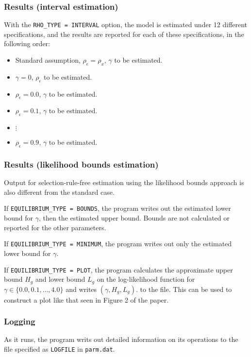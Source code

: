 \documentclass{article}
\begin{document}
\subsubsection{Results (interval estimation)}

With the {\tt RHO\_{}TYPE = INTERVAL} option, the model is estimated under 
12 different specifications, and the results are reported for each of these 
specifications, in the following order:
\begin{itemize}
	\item Standard assumption, $\rho_{\epsilon}=\rho_x$, $\gamma$ to be estimated.
	\item $\gamma=0$, $\rho_{\epsilon}$ to be estimated.
	\item $\rho_{\epsilon}= 0.0$, $\gamma$ to be estimated.
	\item $\rho_{\epsilon}= 0.1$, $\gamma$ to be estimated.
	\item $\vdots$
	\item $\rho_{\epsilon}= 0.9$, $\gamma$ to be estimated.
\end{itemize}

\subsubsection{Results (likelihood bounds estimation)}

Output for selection-rule-free estimation using the likelihood bounds
approach is also different from the standard case.

If {\tt EQUILIBRIUM\_{}TYPE = BOUNDS}, the program writes out the estimated
lower bound for $\gamma$, then the estimated upper bound.  Bounds are not calculated
or reported for the other parameters.

If {\tt EQUILIBRIUM\_{}TYPE = MINIMUM}, the program writes out only the estimated
lower bound for $\gamma$.

If {\tt EQUILIBRIUM\_{}TYPE = PLOT}, the program calculates the approximate
upper bound $H_g$ and lower bound $L_g$ on the log-likelihood function for $\gamma \in \{0.0,0.1,\ldots,4.0\}$
and writes $(\gamma,H_g,L_g)$. to the file.  This can be used to construct a plot
like that seen in Figure 2 of the paper.

\subsubsection{Logging}

As it runs, the program writs out detailed information on its operations to the file specified as 
{\tt LOGFILE} in {\tt parm.dat}.  
\end{document}
